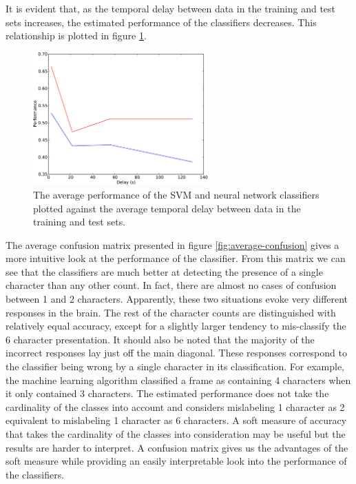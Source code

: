 \documentclass{article}
\begin{document}
It is evident that, as the temporal delay between data in the training and test sets increases, the estimated performance of the classifiers decreases.
This relationship is plotted in figure \ref{fig:performance-verse-temporal-distance}.

\begin{figure}
\centering
\includegraphics[width=0.6\textwidth]{figures/performance-verse-temporal-distance}
\caption{The average performance of the SVM and neural network classifiers plotted against the average temporal delay between data in the training and test sets.}
\label{fig:performance-verse-temporal-distance}
\end{figure}

The average confusion matrix presented in figure \ref{fig:average-confusion} gives a more intuitive look at the performance of the classifier.
From this matrix we can see that the classifiers are much better at detecting the presence of a single character than any other count.
In fact, there are almost no cases of confusion between 1 and 2 characters.
Apparently, these two situations evoke very different responses in the brain.
The rest of the character counts are distinguished with relatively equal accuracy,
except for a slightly larger tendency to mis-classify the 6 character presentation.
It should also be noted that the majority of the incorrect responses lay just off the main diagonal.
These responses correspond to the classifier being wrong by a single character in its classification.
For example, the machine learning algorithm classified a frame as containing 4 characters when it only contained 3 characters.
The estimated performance does not take the cardinality of the classes into account and considers mislabeling 1 character as 2 equivalent to mislabeling 1 character as 6 characters.
A soft measure of accuracy that takes the cardinality of the classes into consideration may be useful but the results are harder to interpret.
A confusion matrix gives us the advantages of the soft measure while providing an easily interpretable look into the performance of the classifiers.
\end{document}
